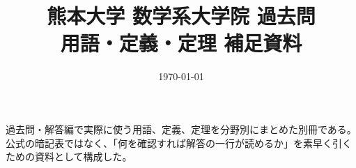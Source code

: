\documentclass[uplatex, dvipdfmx]{jsreport}
\title{熊本大学 数学系大学院 過去問\\{\Large 用語・定義・定理 補足資料}}
\author{}
\date{\today}
\begin{document}
\maketitle

\begin{memo*}
過去問・解答編で実際に使う用語、定義、定理を分野別にまとめた別冊である。
公式の暗記表ではなく、「何を確認すれば解答の一行が読めるか」を素早く引くための資料として構成した。
\end{memo*}

\tableofcontents

\end{document}
